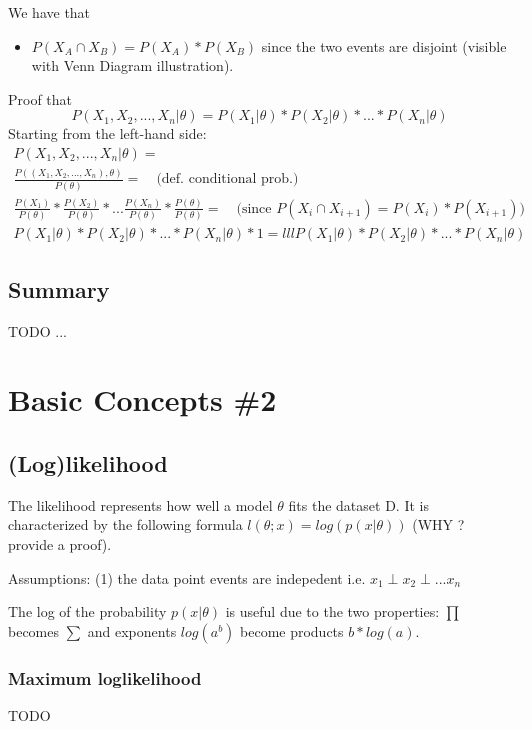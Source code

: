 \documentclass[12pt]{article}
\begin{document}
We have that
\begin{itemize}
    \item $P(X_A \cap X_{B}) = P(X_A) * P(X_{B})$ since the two events are disjoint (visible with Venn Diagram illustration).
\end{itemize}

Proof that $$P(X_1, X_2, ..., X_n | \theta) = P(X_1 | \theta) * P(X_2 | \theta) * ... * P(X_n | \theta)$$
Starting from the left-hand side:
\begin{align*}
    P(X_1, X_2, ..., X_n | \theta) = \\
    \frac{P((X_1, X_2, ..., X_n) , \theta)}{P(\theta)}  =  \quad \text{(def. conditional prob.)}  \\
    \frac{P(X_1)}{P(\theta)} * \frac{P(X_2)}{P(\theta)} * ... \frac{P(X_n)}{P(\theta)} * \frac{P(\theta)}{P(\theta)} = \quad \text{(since $P(X_i \cap X_{i+1}) = P(X_i) * P(X_{i+1})$)} \\
    P(X_1 | \theta) * P(X_2 | \theta) * ... * P(X_n | \theta) * 1 = lllP(X_1 | \theta) * P(X_2 | \theta) * ... * P(X_n | \theta)
\end{align*}

\subsection{Summary}
TODO ...

\section{Basic Concepts \#2}\label{basic_prob_sec2}

\subsection{(Log)likelihood}
The likelihood represents how well a model $\theta$ fits the dataset D.
It is characterized by the following formula $l(\theta; x) = log(p(x|\theta))$ (WHY ? provide a proof).

Assumptions: (1) the data point events are indepedent i.e. $x_1 \perp x_2 \perp ... x_n$ 

The log of the probability $p(x | \theta)$ is useful due to the two properties: $\prod$ becomes $\sum$ and exponents $log(a^b)$ become products $b * log(a)$.

\subsubsection{Maximum loglikelihood}
TODO
\end{document}
